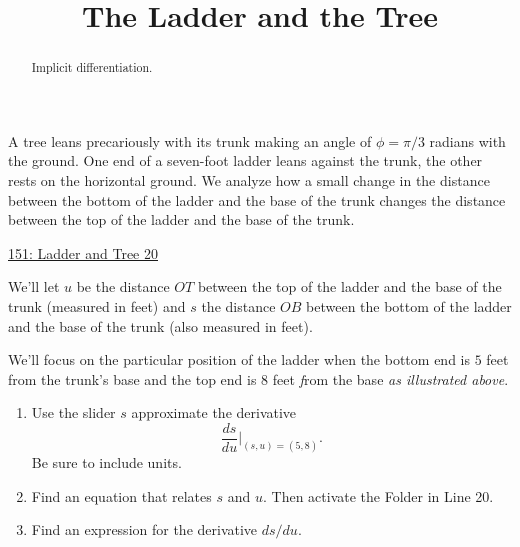 \documentclass{ximera}
\title{The Ladder and the Tree}
\begin{document}
\begin{abstract}
Implicit differentiation.
\end{abstract}
\maketitle

\begin{question} \label{Q43hhbnhhnnzzz}

A tree leans precariously with its trunk making an angle of $\phi = \pi/3$ radians with the ground. One end of a seven-foot ladder leans against the trunk, the other rests on the horizontal ground. We analyze how a small change in the distance between the bottom of the ladder and the base of the trunk changes the distance between the top of the ladder and the base of the trunk.


 
\begin{onlineOnly}
   \begin{center}
\end{center}
\end{onlineOnly}

\href{https://www.desmos.com/calculator/mvscpe0dge}{151: Ladder and Tree 20}

We'll let $u$ be the distance $OT$ between the top of the ladder and the base of the trunk (measured in feet) and  $s$ the distance $OB$ between the bottom of the ladder and the base of the trunk (also measured in feet).



We'll focus on the particular position of the ladder when the bottom end is $5$ feet from the trunk's base and the top end is $8$ feet \emph from the base \emph{as illustrated above}.

\begin{enumerate}

\item Use the slider $s$ approximate the derivative
\[
\frac{ds}{du}\Big|_{(s,u) = (5,8)} .
\]
Be sure to include units.

\item Find an equation that relates $s$ and $u$. Then activate the Folder in Line 20.

\item Find an expression for the derivative $ds/du$.


\end{enumerate}
\end{question}
\end{document}
